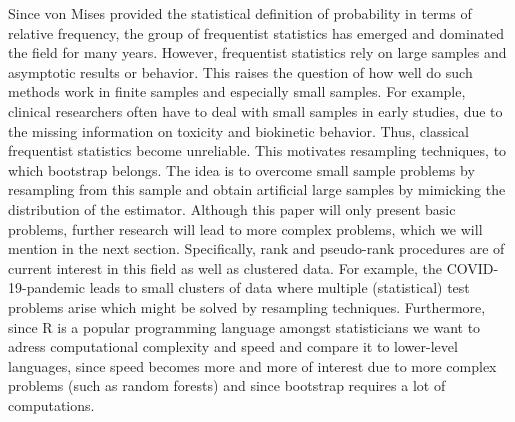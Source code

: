 Since von Mises provided the statistical definition of probability in terms of relative frequency, the group of frequentist statistics has emerged and dominated the field for many years. However, frequentist statistics rely on large samples and asymptotic results or behavior. This raises the question of how well do such methods work in finite samples and especially small samples. For example, clinical researchers often have to deal with small samples in early studies, due to the missing information on toxicity and biokinetic behavior. Thus, classical frequentist statistics become unreliable. This motivates resampling techniques, to which bootstrap belongs. The idea is to overcome small sample problems by resampling from this sample and obtain artificial large samples by mimicking the distribution of the estimator. Although this paper will only present basic problems, further research will lead to more complex problems, which we will mention in the next section. Specifically, rank and pseudo-rank procedures are of current interest in this field as well as clustered data. For example, the COVID-19-pandemic leads to small clusters of data where multiple (statistical) test problems arise which might be solved by resampling techniques. Furthermore, since R is a popular programming language amongst statisticians we want to adress computational complexity and speed and compare it to lower-level languages, since speed becomes more and more of interest due to more complex problems (such as random forests) and since bootstrap requires a lot of computations.